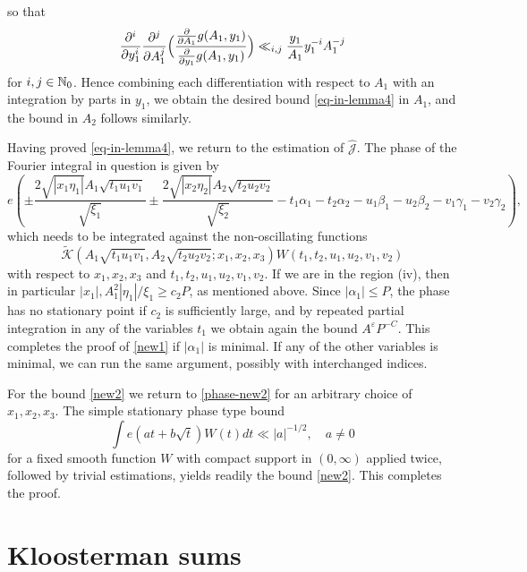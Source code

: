 \documentclass[11pt]{amsart}
\theoremstyle{plain}
\numberwithin{equation}{section}
\theoremstyle{definition}
\renewcommand{\geq}{\geqslant}
\renewcommand{\leq}{\leqslant}
\begin{document}
so that
$$%
 \frac{\partial^i}{\partial y^i_1}\frac{\partial^j}{\partial A^j_1} \Bigl( \frac{\frac{\partial}{\partial A_1} g(A_1, y_1)}{\frac{\partial}{\partial y_1} g(A_1, y_1)}\Bigr)   \ll_{i, j}  \frac{y_1}{A_1} y_1^{-i}A_1^{-j}$$
 for $i, j \in \Bbb{N}_0$. 
Hence combining each differentiation with respect to $A_1$ with an integration by parts in $y_1$, we obtain the desired bound \eqref{eq-in-lemma4} in $A_1$, and the bound in $A_2$ follows similarly. 

Having proved \eqref{eq-in-lemma4}, we return to the estimation of $\widehat{\mathcal{J}}$. The phase of the Fourier integral in question is given by 
\begin{equation}\label{phase-new2}
e\left(\pm \frac{ 2\sqrt{|x_1\eta_1|} A_1 \sqrt{t_1u_1v_1}}{\sqrt{\xi_1}}\pm  \frac{ 2\sqrt{|x_2\eta_2|} A_2 \sqrt{t_2u_2v_2}}{\sqrt{\xi_2}} -t_1\alpha_1 - t_2\alpha_2 - u_1\beta_1-u_2\beta_2 - v_1\gamma_1-v_2\gamma_2\right),
\end{equation}
which needs to be integrated against the non-oscillating functions
$$ \tilde{\mathcal{K}}(A_1\sqrt{t_1u_1v_1}, A_2\sqrt{t_2u_2v_2}; x_1, x_2, x_3) W(t_1, t_2, u_1, u_2, v_1, v_2)$$
with respect to $x_1, x_2, x_3$  and $t_1, t_2, u_1, u_2, v_1, v_2$. If we are in the region (iv), then in particular $
 |x_1|, A_1^2 |\eta_1|/\xi_1 \geq c_2 P$, as mentioned above. Since $|\alpha_1| \leq P$,   the phase has no stationary point if $c_2$ is sufficiently large, and by repeated partial integration in any of the variables $t_1$ we obtain again the bound $A^{\varepsilon} P^{-C}$. This completes the proof of \eqref{new1} if $|\alpha_1|$ is minimal. If any of the other variables is minimal, we can run the same argument, possibly with interchanged indices. 
 
For the bound \eqref{new2} we return to \eqref{phase-new2} for an arbitrary choice of  $x_1, x_2, x_3$. The simple  stationary phase type bound
 $$\int e(at+b \sqrt{t}) W(t) dt \ll |a|^{-1/2}, \quad a \not= 0$$
for a fixed smooth function $W$ with compact support in $(0, \infty)$ applied twice, followed by trivial estimations, yields readily the bound \eqref{new2}.  This completes the proof. 

 
\section{Kloosterman sums}
\end{document}
